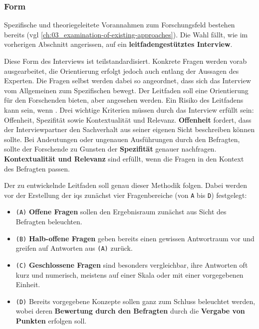 \subsubsection{Form}
\label{subsubsec:04-01-02-02_form}

Spezifische und theoriegeleitete Vorannahmen zum Forschungsfeld bestehen bereits (\acrshort{vgl} \autoref{ch:03_examination-of-existing-approaches}). Die Wahl fällt, wie im vorherigen Abschnitt angerissen, auf ein \textbf{leitfadengestütztes Interview}.

Diese Form des Interviews ist teilstandardisiert. Konkrete Fragen werden vorab ausgearbeitet, die Orientierung erfolgt jedoch auch entlang der Aussagen des Experten. Die Fragen selbst werden dabei so angeordnet, dass sich das Interview vom Allgemeinen zum Spezifischen bewegt. \cite{205:Leitfadengestuetztes-Interview} Der Leitfaden soll eine Orientierung für den Forschenden bieten, aber  \cite{401:Das-Experteninterview} angesehen werden. Ein Risiko des Leitfadens kann sein, wenn  \cite{401:Das-Experteninterview}. Drei wichtige Kriterien müssen durch das Interview erfüllt sein: Offenheit, Spezifität sowie Kontextualität und Relevanz. \textbf{Offenheit} fordert, dass der Interviewpartner den Sachverhalt aus seiner eigenen Sicht beschreiben können sollte. Bei Andeutungen oder ungenauen Ausführungen durch den Befragten, sollte der Forschende zu Gunsten der \textbf{Spezifität} genauer nachfragen. \textbf{Kontextualität und Relevanz} sind erfüllt, wenn die Fragen in den Kontext des Befragten passen. \cite{205:Leitfadengestuetztes-Interview}

Der zu entwickelnde Leitfaden soll genau dieser Methodik folgen. Dabei werden vor der Erstellung der \Glspl{iq} zunächst vier Fragenbereiche (von \texttt{A} bis \texttt{D}) festgelegt:

\begin{itemize}
    \item \texttt{(A)} \textbf{Offene Fragen} sollen den Ergebnisraum zunächst aus Sicht des Befragten beleuchten.
    \item \texttt{(B)} \textbf{Halb-offene Fragen} geben bereits einen gewissen Antwortraum vor und greifen auf Antworten aus \texttt{(A)} zurück.
    \item \texttt{(C)} \textbf{Geschlossene Fragen} sind besonders vergleichbar, ihre Antworten oft kurz und numerisch, meistens auf einer Skala oder mit einer vorgegebenen Einheit.
    \item \texttt{(D)} Bereits vorgegebene Konzepte sollen ganz zum Schluss beleuchtet werden, wobei deren \textbf{Bewertung durch den Befragten} durch die \textbf{Vergabe von Punkten} erfolgen soll.
\end{itemize}

